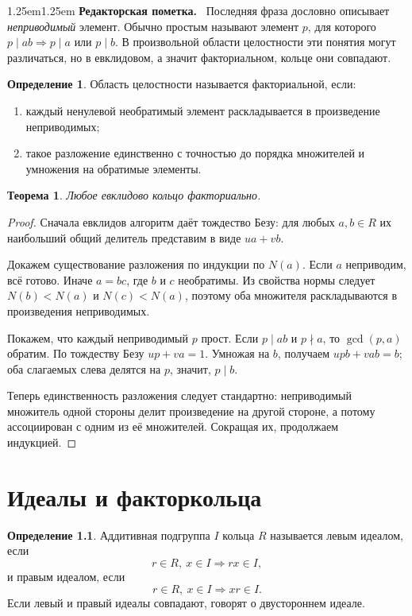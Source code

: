 \documentclass[12pt,a4paper,oneside,openany]{book}
\theoremstyle{definition}
\newtheorem{definition}{Определение}[chapter]
\theoremstyle{plain}
\newtheorem{theorem}{Теорема}[chapter]
\theoremstyle{remark}
\newenvironment{editorialnote}
  {\begin{adjustwidth}{1.25em}{1.25em}\small
   \noindent\textcolor{editorred}{\sffamily\bfseries Редакторская пометка.}\ }
  {\par\end{adjustwidth}}
\begin{document}
\begin{editorialnote}
Последняя фраза дословно описывает \emph{неприводимый} элемент. Обычно
простым называют элемент $p$, для которого
$p\mid ab\Rightarrow p\mid a$ или $p\mid b$. В произвольной области
целостности эти понятия могут различаться, но в евклидовом, а значит
факториальном, кольце они совпадают.
\end{editorialnote}

\begin{definition}
Область целостности называется факториальной, если:
\begin{enumerate}[label=\arabic*)]
  \item каждый ненулевой необратимый элемент раскладывается в произведение
  неприводимых;
  \item такое разложение единственно с точностью до порядка множителей и
  умножения на обратимые элементы.
\end{enumerate}
\end{definition}


\begin{theorem}
Любое евклидово кольцо факториально.
\end{theorem}

\begin{proof}
Сначала евклидов алгоритм даёт тождество Безу: для любых $a,b\in R$
их наибольший общий делитель представим в виде $ua+vb$.

Докажем существование разложения по индукции по $N(a)$. Если $a$
неприводим, всё готово. Иначе $a=bc$, где $b$ и $c$ необратимы.
Из свойства нормы следует $N(b)<N(a)$ и $N(c)<N(a)$, поэтому оба
множителя раскладываются в произведения неприводимых.

Покажем, что каждый неприводимый $p$ прост. Если $p\mid ab$ и
$p\nmid a$, то $\gcd(p,a)$ обратим. По тождеству Безу
$up+va=1$. Умножая на $b$, получаем
$upb+vab=b$; оба слагаемых слева делятся на $p$, значит, $p\mid b$.

Теперь единственность разложения следует стандартно: неприводимый
множитель одной стороны делит произведение на другой стороне, а потому
ассоциирован с одним из её множителей. Сокращая их, продолжаем
индукцией.
\end{proof}

\chapter{Идеалы и факторкольца}

\begin{definition}
Аддитивная подгруппа $I$ кольца $R$ называется левым идеалом, если
\[
  r\in R,\ x\in I\Rightarrow rx\in I,
\]
и правым идеалом, если
\[
  r\in R,\ x\in I\Rightarrow xr\in I.
\]
Если левый и правый идеалы совпадают, говорят о двустороннем идеале.
\end{definition}
\end{document}
